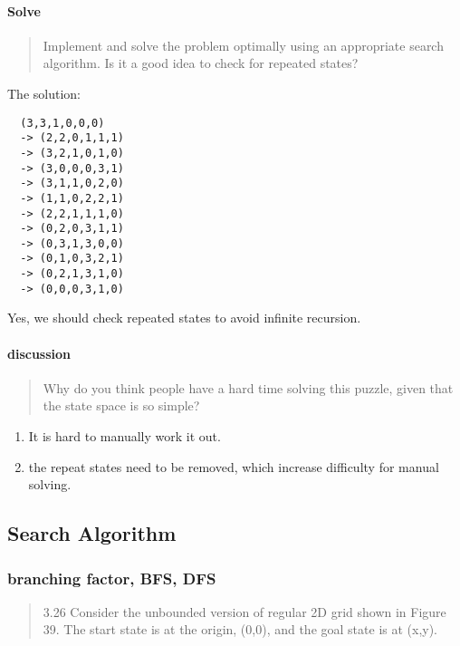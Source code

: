 \paragraph{Solve}
\begin{quote}
Implement and solve the problem optimally using an appropriate search algorithm.
Is it a good idea to check for repeated states?
\end{quote}

The solution:
\begin{lstlisting}
  (3,3,1,0,0,0)
  -> (2,2,0,1,1,1)
  -> (3,2,1,0,1,0)
  -> (3,0,0,0,3,1)
  -> (3,1,1,0,2,0)
  -> (1,1,0,2,2,1)
  -> (2,2,1,1,1,0)
  -> (0,2,0,3,1,1)
  -> (0,3,1,3,0,0)
  -> (0,1,0,3,2,1)
  -> (0,2,1,3,1,0)
  -> (0,0,0,3,1,0)
\end{lstlisting}
Yes, we should check repeated states to avoid infinite recursion.

\paragraph{discussion}
\begin{quote}
  Why do you think people have a hard time solving this puzzle,
  given that the state space is so simple?
\end{quote}

\begin{enumerate}
\item It is hard to manually work it out.
\item the repeat states need to be removed, which increase difficulty for manual solving.
\end{enumerate}



\subsection{Search Algorithm}

\subsubsection{branching factor, BFS, DFS}
\begin{quote}
  3.26 Consider the unbounded version of regular 2D grid shown in Figure 39.
  The start state is at the origin, (0,0), and the goal state is at (x,y).
\end{quote}

